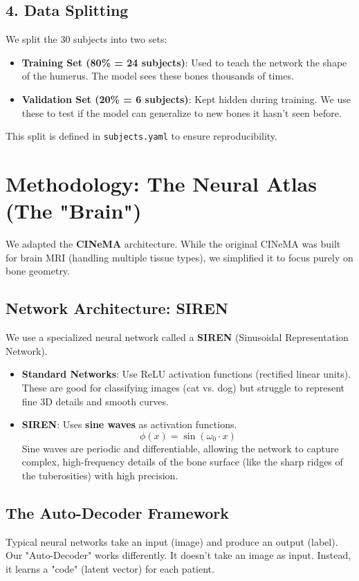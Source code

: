 \documentclass[12pt]{article}
\begin{document}
\subsection{4. Data Splitting}
We split the 30 subjects into two sets:
\begin{itemize}
    \item \textbf{Training Set (80\% = 24 subjects)}: Used to teach the network the shape of the humerus. The model sees these bones thousands of times.
    \item \textbf{Validation Set (20\% = 6 subjects)}: Kept hidden during training. We use these to test if the model can generalize to new bones it hasn't seen before.
\end{itemize}
This split is defined in \texttt{subjects.yaml} to ensure reproducibility.

\section{Methodology: The Neural Atlas (The "Brain")}

We adapted the \textbf{CINeMA} architecture. While the original CINeMA was built for brain MRI (handling multiple tissue types), we simplified it to focus purely on bone geometry.

\subsection{Network Architecture: SIREN}
We use a specialized neural network called a \textbf{SIREN} (Sinusoidal Representation Network). 
\begin{itemize}
    \item \textbf{Standard Networks}: Use ReLU activation functions (rectified linear units). These are good for classifying images (cat vs. dog) but struggle to represent fine 3D details and smooth curves.
    \item \textbf{SIREN}: Uses \textbf{sine waves} as activation functions.
    \begin{equation}
        \phi(x) = \sin(\omega_0 \cdot x)
    \end{equation}
    Sine waves are periodic and differentiable, allowing the network to capture complex, high-frequency details of the bone surface (like the sharp ridges of the tuberosities) with high precision.
\end{itemize}

\subsection{The Auto-Decoder Framework}
Typical neural networks take an input (image) and produce an output (label). Our "Auto-Decoder" works differently. It doesn't take an image as input. Instead, it learns a "code" (latent vector) for each patient.
\end{document}
